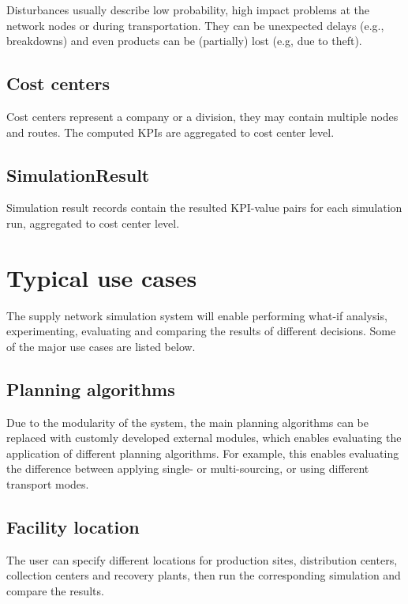 \documentclass{article}
\begin{document}
Disturbances usually describe low probability, high impact problems at the network nodes or during transportation. They can be unexpected delays (e.g., breakdowns) and even products can be (partially) lost (e.g, due to theft).


\subsection{Cost centers}

Cost centers represent a company or a division, they may contain multiple nodes and routes. The computed KPIs are aggregated to cost center level.


\subsection{SimulationResult}

Simulation result records contain the resulted KPI-value pairs for each simulation run, aggregated to cost center level.


\section{Typical use cases}

The supply network simulation system will enable performing what-if analysis, experimenting, evaluating and comparing the results of different decisions. Some of the major use cases are listed below.

\subsection{Planning algorithms}

Due to the modularity of the system, the main planning algorithms can be replaced with customly developed external modules, which enables evaluating the application of different planning algorithms. For example, this enables evaluating the difference between applying single- or multi-sourcing, or using different transport modes.


\subsection{Facility location}

The user can specify different locations for production sites, distribution centers, collection centers and recovery plants, then run the corresponding simulation and compare the results.
\end{document}

